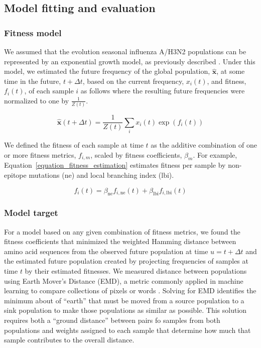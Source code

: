 \subsection*{Model fitting and evaluation}

\subsubsection*{Fitness model}

We assumed that the evolution seasonal influenza A/H3N2 populations can be represented by an exponential growth model, as previously described \cite{Luksza:2014hj}.
Under this model, we estimated the future frequency of the global population, $\mathbf{\hat{x}}$, at some time in the future, $t + \Delta{t}$, based on the current frequency, $x_{i}(t)$, and fitness, $f_{i}(t)$, of each sample $i$ as follows where the resulting future frequencies were normalized to one by $\frac{1}{Z(t)}$.

\begin{equation}
    \mathbf{\hat{x}}(t + \Delta{t}) = \frac{1}{Z(t)}\sum_{i}x_{i}(t)\exp(f_{i}(t))
    \label{equation_exponential_growth_model}
\end{equation}

We defined the fitness of each sample at time $t$ as the additive combination of one or more fitness metrics, $f_{i,m}$, scaled by fitness coefficients, $\beta_{m}$.
For example, Equation~\ref{equation_fitness_estimation} estimates fitness per sample by non-epitope mutations ($\mathrm{ne}$) and local branching index ($\mathrm{lbi}$).

\begin{equation}
    f_{i}(t) = \beta_{\mathrm{ne}}f_{i, \mathrm{ne}}(t) + \beta_{\mathrm{lbi}}f_{i, \mathrm{lbi}}(t)
    \label{equation_fitness_estimation}
\end{equation}

\subsubsection*{Model target}

For a model based on any given combination of fitness metrics, we found the fitness coefficients that minimized the weighted Hamming distance between amino acid sequences from the observed future population at time $u = t + \Delta{t}$ and the estimated future population created by projecting frequencies of samples at time $t$ by their estimated fitnesses.
We measured distance between populations using Earth Mover's Distance (EMD), a metric commonly applied in machine learning to compare collections of pixels or words \cite{Rubner1998,Kusner2015}.
Solving for EMD identifies the minimum about of ``earth'' that must be moved from a source population to a sink population to make those populations as similar as possible.
This solution requires both a ``ground distance'' between pairs fo samples from both populations and weights assigned to each sample that determine how much that sample contributes to the overall distance.

